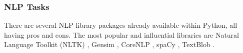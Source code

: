 	\subsubsection{NLP Tasks}
	There are several NLP library packages already available within Python, all having pros and cons. The most popular and influential libraries are Natural Language Toolkit (NLTK) \cite{bird2009natural}, Gensim \cite{gensim}, CoreNLP \cite{core_NLP}, spaCy \cite{spacy2}, TextBlob \cite{loria2018textblob}.%
	
	
	
	
	
	
